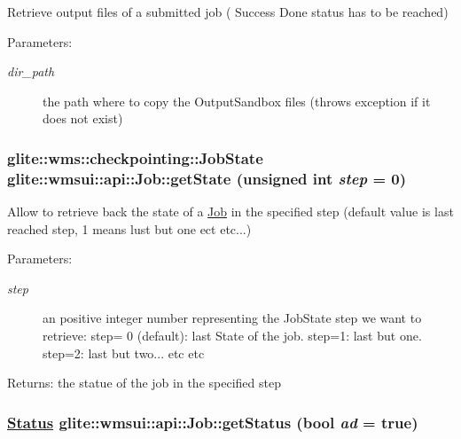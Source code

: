Retrieve output files of a submitted job ( Success Done status has to be reached) \begin{Desc}
\item[Parameters:]
\begin{description}
\item[{\em dir\_\-path}]the path where to copy the Output\-Sandbox files (throws exception if it does not exist) \end{description}
\end{Desc}
\hypertarget{classglite_1_1wmsui_1_1api_1_1Job_z19_0}{
\subsubsection[getState]{\setlength{\rightskip}{0pt plus 5cm}glite::wms::checkpointing::Job\-State glite::wmsui::api::Job::get\-State (unsigned int {\em step} = 0)}}
\label{classglite_1_1wmsui_1_1api_1_1Job_z19_0}


Allow to retrieve back the state of a \hyperlink{classglite_1_1wmsui_1_1api_1_1Job}{Job} in the specified step (default value is last reached step, 1 means lust but one ect etc...) \begin{Desc}
\item[Parameters:]
\begin{description}
\item[{\em step}]an positive integer number representing the Job\-State step we want to retrieve: step= 0 (default): last State of the job. step=1: last but one. step=2: last but two... etc etc \end{description}
\end{Desc}
\begin{Desc}
\item[Returns:]the statue of the job in the specified step \end{Desc}
\hypertarget{classglite_1_1wmsui_1_1api_1_1Job_z21_0}{
\subsubsection[getStatus]{\setlength{\rightskip}{0pt plus 5cm}\hyperlink{namespaceglite_1_1wmsui_1_1api_a24}{Status} glite::wmsui::api::Job::get\-Status (bool {\em ad} = true)}}
\label{classglite_1_1wmsui_1_1api_1_1Job_z21_0}


